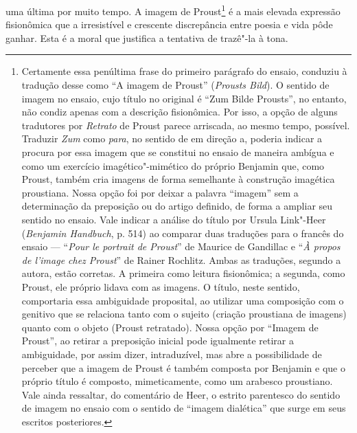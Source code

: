 uma última por muito tempo. A imagem de Proust\footnote{Certamente
  essa penúltima frase do primeiro parágrafo do ensaio, conduziu à
  tradução desse como ``A imagem de Proust'' (\emph{Prousts Bild}). O
  sentido de imagem no ensaio, cujo título no original é ``Zum Bilde
  Prousts'', no entanto, não condiz apenas com a descrição fisionômica.
  Por isso, a opção de alguns tradutores por \emph{Retrato} de Proust
  parece arriscada, ao mesmo tempo, possível. Traduzir \emph{Zum} como
  \emph{para}, no sentido de em direção a, poderia indicar a procura por
  essa imagem que se constitui no ensaio de maneira ambígua e como um
  exercício imagético"-mimético do próprio Benjamin que, como Proust,
  também cria imagens de forma semelhante à construção imagética
  proustiana. Nossa opção foi por deixar a palavra ``imagem'' sem a
  determinação da preposição ou do artigo definido, de forma a ampliar
  seu sentido no ensaio. Vale indicar a análise do título por Ursula
  Link"-Heer (\emph{Benjamin Handbuch}, p. 514) ao comparar duas traduções
  para o francês do ensaio --- ``\emph{Pour le portrait de Proust}'' de
  Maurice de Gandillac e ``\emph{À propos de l'image chez Proust}'' de
  Rainer Rochlitz. Ambas as traduções, segundo a autora, estão corretas.
  A primeira como leitura fisionômica; a segunda, como Proust, ele
  próprio lidava com as imagens. O título, neste sentido, comportaria
  essa ambiguidade proposital, ao utilizar uma composição com o genitivo
  que se relaciona tanto com o sujeito (criação proustiana de imagens)
  quanto com o objeto (Proust retratado). Nossa opção por ``Imagem de
  Proust'', ao retirar a preposição inicial pode igualmente retirar a
  ambiguidade, por assim dizer, intraduzível, mas abre a possibilidade
  de perceber que a imagem de Proust é também composta por Benjamin e
  que o próprio título é composto, mimeticamente, como um arabesco
  proustiano. Vale ainda ressaltar, do comentário de Heer, o estrito
  parentesco do sentido de imagem no ensaio com o sentido de ``imagem
  dialética'' que surge em seus escritos posteriores. \versal{[N. T.]}} é a mais elevada
expressão fisionômica que a irresistível e crescente discrepância entre
poesia e vida pôde ganhar. Esta é a moral que justifica a tentativa de
trazê"-la à tona.

